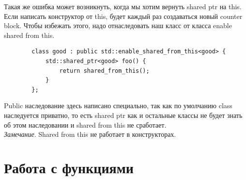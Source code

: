 \documentclass[12pt, a4paper]{article}
\begin{document}
	Такая же ошибка может возникнуть, когда мы хотим вернуть shared ptr на this. Если написать конструктор от this, будет каждый раз создаваться новый counter block. Чтобы избежать этого, надо отнаследовать наш класс от класса enable shared from this.
	\begin{verbatim}
		class good : public std::enable_shared_from_this<good> {
			std::shared_ptr<good> foo() {
				return shared_from_this();
			}
		};
	\end{verbatim}
	Public наследование здесь написано специально, так как по умолчанию class наследуется приватно, то есть shared ptr как и остальные классы не будет знать об этом наследовании и shared from this не сработает.
	\\\textit{Замечание}. Shared from this не работает в конструкторах.
	\section{Работа с функциями}
\end{document}
